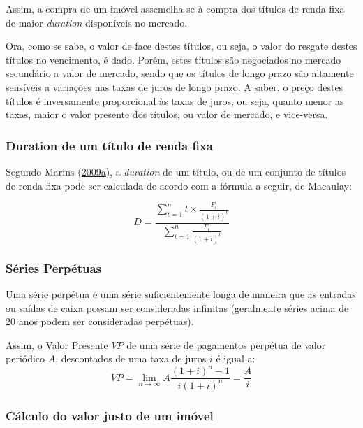 \documentclass[
	12pt,				%
	oneside,			%
	a4paper,			%
	chapter=TITLE,		%
	section=TITLE,		%
	english,			%
	brazil				%
	]{abntex2}
\begin{document}
Assim, a compra de um imóvel assemelha-se à compra dos títulos de renda fixa de
maior \emph{duration} disponíveis no mercado.

Ora, como se sabe, o valor de face destes títulos, ou seja, o valor do resgate
destes títulos no vencimento, é dado. Porém, estes títulos são negociados no
mercado secundário a valor de mercado, sendo que os títulos de longo prazo são
altamente sensíveis a variações nas taxas de juros de longo prazo. A saber, o
preço destes títulos é inversamente proporcional às taxas de juros, ou seja,
quanto menor as taxas, maior o valor presente dos títulos, ou valor de mercado,
e vice-versa.

\hypertarget{duration-de-um-tuxedtulo-de-renda-fixa}{%
\subsubsection{Duration de um título de renda fixa}\label{duration-de-um-tuxedtulo-de-renda-fixa}}

Segundo Marins (\protect\hyperlink{ref-marins1}{2009}\protect\hyperlink{ref-marins1}{a}), a \emph{duration} de um título, ou de um conjunto de títulos de
renda fixa pode ser calculada de acordo com a fórmula a seguir, de Macaulay:

\[D = \frac{\sum_{t = 1}^{n}t \times \frac{F_t}{(1+i)^t}}{\sum_{t = 1}^{n} \frac{F_t}{(1+i)^t}}\]

\hypertarget{suxe9ries-perpuxe9tuas}{%
\subsubsection{Séries Perpétuas}\label{suxe9ries-perpuxe9tuas}}

Uma série perpétua é uma série suficientemente longa de maneira que as entradas
ou saídas de caixa possam ser consideradas infinitas (geralmente séries acima de
20 anos podem ser consideradas perpétuas).

Assim, o Valor Presente \(VP\) de uma série de pagamentos perpétua de valor
periódico \(A\), descontados de uma taxa de juros \(i\) é igual a:
\begin{equation}
VP = \lim_{n \to \infty} A \frac{(1+i)^n-1}{i(1+i)^n}= \frac{A}{i}
\label{eq:perpetua}
\end{equation}
\hypertarget{cuxe1lculo-do-valor-justo-de-um-imuxf3vel}{%
\subsubsection{Cálculo do valor justo de um imóvel}\label{cuxe1lculo-do-valor-justo-de-um-imuxf3vel}}
\end{document}
